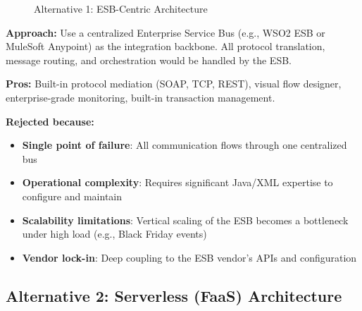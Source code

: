 \documentclass[12pt,a4paper]{article}
\begin{document}
\begin{figure}[H]
\centering
{}
\caption{Alternative 1: ESB-Centric Architecture}
\end{figure}

\textbf{Approach:} Use a centralized Enterprise Service Bus (e.g., WSO2 ESB or MuleSoft Anypoint) as the integration backbone. All protocol translation, message routing, and orchestration would be handled by the ESB.

\textbf{Pros:} Built-in protocol mediation (SOAP, TCP, REST), visual flow designer, enterprise-grade monitoring, built-in transaction management.

\textbf{Rejected because:}
\begin{itemize}
  \item \textbf{Single point of failure}: All communication flows through one centralized bus
  \item \textbf{Operational complexity}: Requires significant Java/XML expertise to configure and maintain
  \item \textbf{Scalability limitations}: Vertical scaling of the ESB becomes a bottleneck under high load (e.g., Black Friday events)
  \item \textbf{Vendor lock-in}: Deep coupling to the ESB vendor's APIs and configuration
\end{itemize}

\subsection{Alternative 2: Serverless (FaaS) Architecture}
\end{document}
